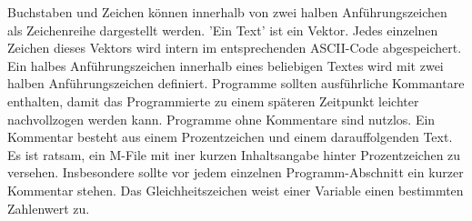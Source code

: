 {Buchstaben und Zeichen können innerhalb von zwei halben Anführungszeichen  als Zeichenreihe dargestellt werden. 'Ein Text' ist ein Vektor. Jedes einzelnen Zeichen dieses Vektors wird intern im entsprechenden ASCII-Code abgespeichert. Ein halbes Anführungszeichen innerhalb eines beliebigen Textes wird mit zwei halben Anführungszeichen definiert.  
\newline\newline
Programme sollten ausführliche Kommantare \boxed{\textbf{\texttt{\%}}} enthalten, damit das Programmierte zu einem späteren Zeitpunkt leichter nachvollzogen werden kann. Programme ohne Kommentare sind nutzlos. Ein Kommentar besteht aus einem Prozentzeichen und einem darauffolgenden Text. Es ist ratsam, ein M-File mit iner kurzen Inhaltsangabe hinter Prozentzeichen zu versehen. Insbesondere sollte vor jedem einzelnen Programm-Abschnitt ein kurzer Kommentar stehen.
\newline\newline
Das Gleichheitszeichen \boxed{\textbf{\texttt{=}}} weist einer Variable einen bestimmten Zahlenwert zu.
}
